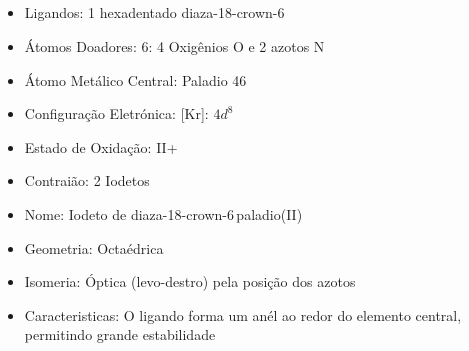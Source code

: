 \documentclass[12pt]{article}
\begin{document}
	\subsection{}
	\begin{itemize}
   
   
   \item Ligandos: 1 hexadentado diaza-18-crown-6
   
   
   \item Átomos Doadores: 6: 4 Oxigênios O e 2 azotos N
   
   \item Átomo Metálico Central: Paladio 46
   
   \item Configuração Eletrónica: 
   	[Kr]: $ 4d^{8} $
	
   \item Estado de Oxidação: II+
	
   \item Contraião: 2 Iodetos 
   
   \item Nome: Iodeto de diaza-18-crown-6\,paladio(II)
   
   \item Geometria: Octaédrica
   
   \item Isomeria: Óptica (levo-destro) pela posição dos azotos

	\item Caracteristicas: O ligando forma um anél ao redor do elemento central, permitindo grande estabilidade

	\end{itemize}
	
\break

	
\end{document}
